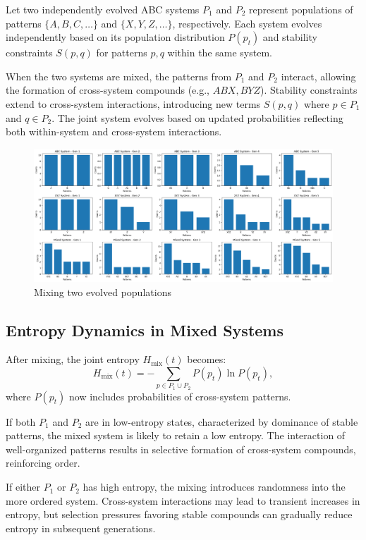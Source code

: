 \documentclass[entropy,article,submit,pdftex,moreauthors]{Definitions/mdpi}
\begin{document}
Let two independently evolved ABC systems \( P_1 \) and \( P_2 \) represent populations of patterns \( \{A, B, C, \dots\} \) and \( \{X, Y, Z, \dots\} \), respectively. Each system evolves independently based on its population distribution \( P(p_t) \) and stability constraints \( S(p, q) \) for patterns \( p, q \) within the same system.

When the two systems are mixed, the patterns from \( P_1 \) and \( P_2 \) interact, allowing the formation of cross-system compounds (e.g., \( ABX, BYZ \)). Stability constraints extend to cross-system interactions, introducing new terms \( S(p, q) \) where \( p \in P_1 \) and \( q \in P_2 \). The joint system evolves based on updated probabilities reflecting both within-system and cross-system interactions.

\begin{figure}[htp]
    \centering
    \includegraphics[width=13cm]{mixed_1}
    \caption{Mixing two evolved populations}
    \label{fig:mixed_1}
\end{figure}

\subsection{Entropy Dynamics in Mixed Systems}

After mixing, the joint entropy \( H_{\text{mix}}(t) \) becomes:
\[
H_{\text{mix}}(t) = -\sum_{p \in P_1 \cup P_2} P(p_t) \ln P(p_t),
\]
where \( P(p_t) \) now includes probabilities of cross-system patterns.

If both \( P_1 \) and \( P_2 \) are in low-entropy states, characterized by dominance of stable patterns, the mixed system is likely to retain a low entropy. The interaction of well-organized patterns results in selective formation of cross-system compounds, reinforcing order.

If either \( P_1 \) or \( P_2 \) has high entropy, the mixing introduces randomness into the more ordered system. Cross-system interactions may lead to transient increases in entropy, but selection pressures favoring stable compounds can gradually reduce entropy in subsequent generations.
\end{document}
